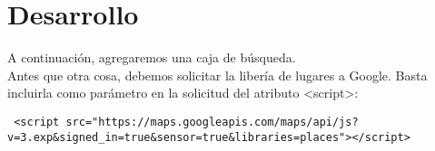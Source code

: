 \section{Desarrollo}

A continuación, agregaremos una caja de búsqueda. 
\\
Antes que otra cosa, debemos solicitar la libería de lugares a Google. Basta incluirla como parámetro en la solicitud del atributo <script>:

\begin{lstlisting}
 <script src="https://maps.googleapis.com/maps/api/js?v=3.exp&signed_in=true&sensor=true&libraries=places"></script>
 \end{lstlisting}

 